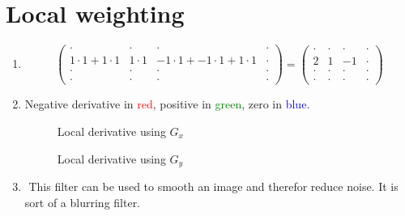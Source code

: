 \documentclass[DIN, pagenumber=false, fontsize=11pt, parskip=half]{scrartcl}
\begin{document}
    \section{Local weighting}
    \begin{enumerate}
        \item 
            \begin{equation*}
                \begin{pmatrix}
                    \cdot & \cdot & \cdot & \cdot \\
                    1 \cdot 1 + 1 \cdot 1 & 1 \cdot 1 & -1 \cdot 1 + -1 \cdot 1 + 1 \cdot 1  & \cdot \\
                    \cdot & \cdot & \cdot & \cdot \\
                    \cdot & \cdot & \cdot & \cdot
                \end{pmatrix} =
                \begin{pmatrix}
                    \cdot & \cdot & \cdot & \cdot \\
                    2 & 1 & -1 & \cdot \\
                    \cdot & \cdot & \cdot & \cdot \\
                    \cdot & \cdot & \cdot & \cdot
                \end{pmatrix}
            \end{equation*}
        \item Negative derivative in \textcolor{red}{red}, positive in \textcolor{green}{green}, zero in \textcolor{blue}{blue}. 
            \begin{figure}[H]
                \centering
                
                \caption{Local derivative using $G_x$}
            \end{figure} 
            \begin{figure}[H]
                \centering
                
                \caption{Local derivative using $G_y$}
            \end{figure} 
        \item $ $ 
            This filter can be used to smooth an image and therefor reduce noise. It is sort of a blurring filter.            
            \begin{figure}[H]
                \centering

\end{figure}
\end{enumerate}
\end{document}
